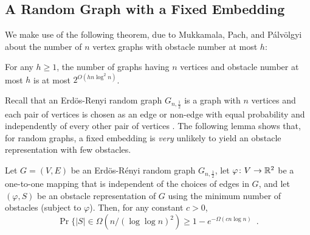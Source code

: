\documentclass{patmorin}
\begin{document}
\subsection{A Random Graph with a Fixed Embedding}

We make use of the following theorem, due to Mukkamala, Pach, and
P\'alv\"olgyi \cite[Theorem~1]{mukkamala.pach.ea:lower} about the number
of $n$ vertex graphs with obstacle number at most $h$:
\begin{thm}
  For any $h\ge 1$, the number of graphs having $n$ vertices and
  obstacle number at most $h$ is at most $2^{O(hn\log^2 n)}$.
\end{thm}

Recall that an Erd\"os-Renyi random graph $G_{n,\frac{1}{2}}$ is a
graph with $n$ vertices and each pair of vertices is chosen as an edge
or non-edge with equal probability and independently of every other pair
of vertices \cite{erdos.renyi:random}.  The following lemma shows that,
for random graphs, a fixed embedding is \emph{very} unlikely to yield
an obstacle representation with few obstacles.


\begin{lem}
  Let $G=(V,E)$ be an Erd\"os-R\'enyi random graph $G_{n,\frac{1}{2}}$,
  let $\varphi\colon V\to \mathbb{R}^2$ be a one-to-one mapping that is
  independent of the choices of edges in $G$, and let $(\varphi, S)$ be
  an obstacle representation of $G$ using the minimum number of obstacles
  (subject to $\varphi$).  Then, for any constant $c>0$,
  \[
     \Pr\{|S| \in \Omega(n/(\log\log n)^2) \ge 1-e^{-\Omega(cn\log n)}  \enspace .
  \] 
\end{lem}
\end{document}
